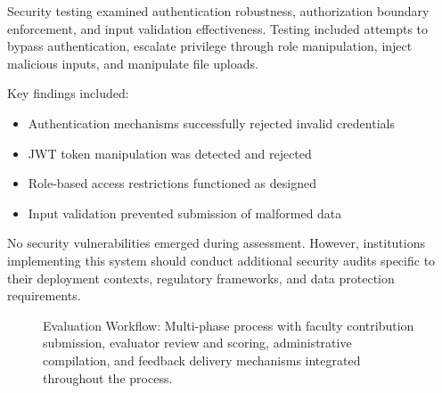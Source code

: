 \documentclass[conference]{IEEEtran}
\begin{document}
Security testing examined authentication robustness, authorization boundary enforcement, and input validation effectiveness. Testing included attempts to bypass authentication, escalate privilege through role manipulation, inject malicious inputs, and manipulate file uploads.

Key findings included:
\begin{itemize}
\item Authentication mechanisms successfully rejected invalid credentials
\item JWT token manipulation was detected and rejected
\item Role-based access restrictions functioned as designed
\item Input validation prevented submission of malformed data
\end{itemize}

No security vulnerabilities emerged during assessment. However, institutions implementing this system should conduct additional security audits specific to their deployment contexts, regulatory frameworks, and data protection requirements.

\begin{figure}[!h]
\centering
{}
\caption{Evaluation Workflow: Multi-phase process with faculty contribution submission, evaluator review and scoring, administrative compilation, and feedback delivery mechanisms integrated throughout the process.}
\label{fig:workflow}
\end{figure}
\end{document}

